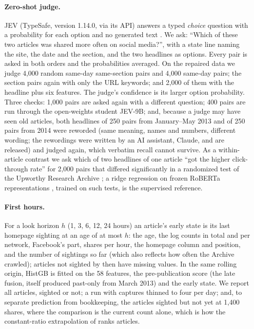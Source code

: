 \documentclass[10pt,a4paper,twocolumn]{article}
\begin{document}
\paragraph{Zero-shot judge.} JEV (TypeSafe, version 1.14.0, via its API) answers a typed \emph{choice} question
with a probability for each option and no generated text \citep{li2026jev}. We ask: ``Which of these two articles
was shared more often on social media?'', with a state line naming the site, the date and the section, and the
two headlines as options. Every pair is asked in both orders and the probabilities averaged. On the repaired data we judge 4{,}000 random same-day same-section pairs and 4{,}000 same-day
pairs; the section pairs again with only the URL keywords; and 2{,}000 of them with the headline plus six features. The judge's
confidence is its larger option probability. Three checks: 1{,}000 pairs are asked again with a different
question; 400 pairs are run through the open-weights student JEV-9B; and, because
a judge may have seen old articles, both headlines of 250 pairs from January--May 2013 and of 250 pairs from
2014 were reworded (same meaning, names and numbers, different wording; the rewordings were written by an AI
assistant, Claude, and are released) and judged again, which verbatim recall cannot survive. As a within-article contrast we ask which of two headlines of one article ``got the higher click-through rate''
for 2{,}000 pairs that differed significantly in a randomized test of the Upworthy Research Archive
\citep{matias2021}; a ridge regression on frozen RoBERTa representations \citep{liu2019roberta}, trained on
such tests, is the supervised reference.

\paragraph{First hours.} For a look horizon $h$ (1, 3, 6, 12, 24 hours) an article's early state is its last
homepage sighting at an age of at most $h$: the age, the log counts in total and per network, Facebook's part,
shares per hour, the homepage column and position, and the number of sightings so far (which also reflects how often the Archive crawled); articles not sighted by
then have missing values. In the same rolling origin, HistGB is fitted on the 58 features, the pre-publication
score (the late fusion, itself produced past-only from March 2013) and the early state. We report all articles,
sighted or not; a run with captures thinned to four per day; and, to separate prediction from bookkeeping, the
articles sighted but not yet at 1{,}400 shares, where the comparison is the current count alone, which is how the
constant-ratio extrapolation of \citet{szabo2010} ranks articles. 
\end{document}
